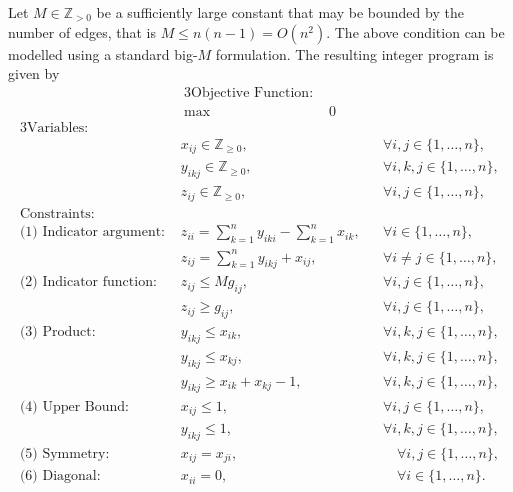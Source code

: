 \documentclass[11pt]{article}
\begin{document}
Let $M \in \mathbb{Z}_{> 0}$ be a sufficiently large constant that may be bounded by the number of edges, that is $M \leq n(n -1) = O(n^2)$. The above condition can be modelled using a standard big-$M$ formulation. The resulting integer program is given by
\begin{alignat}{3}
\text{Objective Function: } & \nonumber \\
\max \quad & 0 \label{eq::integer_objective_function}
\end{alignat}
\begin{alignat}{3}
\text{Variables: } & \nonumber \\ 
& x_{ij} \in \mathbb{Z}_{\geq 0}, 
&& \forall i,j \in \{1, \dots, n\}, \label{eq::IP_x_variable} \\ 
& y_{ikj} \in \mathbb{Z}_{\geq 0}, 
&& \forall i,k,j \in \{1, \dots, n\}, \label{eq::IP_y_variable} \\
& z_{ij} \in \mathbb{Z}_{\geq 0}, 
&& \forall i,j \in \{1, \dots, n\}, \label{eq::IP_z_variable} \\
\text{Constraints: } & \nonumber \\
\text{(1) Indicator argument: } 
& z_{ii} = \sum_{k = 1}^{n}y_{iki} - \sum_{k = 1}^{n} x_{ik}, 
&& \forall i \in \{1, \dots, n\}, \label{eq::IP_fund_matrix} \\
& z_{ij} = \sum_{k = 1}^{n}y_{ikj} + x_{ij}, 
&& \forall i \neq j \in \{1, \dots, n\}, \label{eq::IP_indicator_arg} \\
\text{(2) Indicator function: } 
& z_{ij} \leq M g_{ij}, 
&& \forall i, j \in \{1, \dots, n\}, \label{eq::IP_indicator_upper} \\
& z_{ij} \geq g_{ij}, 
&& \forall i, j \in \{1, \dots, n\}, \label{eq::IP_indicator_lower}\\
\text{(3) Product: } 
& y_{ikj} \leq x_{ik}, 
&& \forall i, k, j \in \{1, \dots, n\}, \label{eq::IP_product_upper_first} \\
& y_{ikj} \leq x_{kj}, 
&& \forall i, k, j \in \{1, \dots, n\}, \label{eq::IP_product_upper_second} \\
& y_{ikj} \geq x_{ik} + x_{kj} - 1, 
&& \forall i, k, j \in \{1, \dots, n\}, \label{eq::IP_product_lower} \\
\text{(4) Upper Bound: } 
& x_{ij} \leq 1, 
&& \forall i, j \in \{1, \dots, n\}, \label{eq::IP_x_upper_bound} \\
& y_{ikj} \leq 1, 
&& \forall i, k, j \in \{1, \dots, n\}, \label{eq::IP_y_upper_bound} \\
\text{(5) Symmetry: } 
& x_{ij} = x_{ji}, 
&&\quad \forall i,j \in \{1, \dots, n\}, \label{eq::IP_symmetry_x} \\
\text{(6) Diagonal: } 
& x_{ii} = 0, 
&&\quad \forall i \in \{1, \dots, n\}.  \label{eq::IP_diagonal_x} 
\end{alignat} \label{eq::integer_program}
\end{document}
